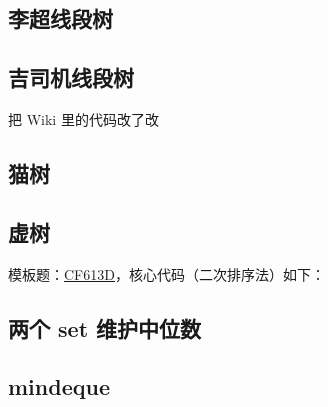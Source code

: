 \documentclass[12pt]{article}
\theoremstyle{definition}
\theoremstyle{remark}
\begin{document}


\newpage

\subsection{李超线段树}



\newpage

\subsection{吉司机线段树}

把 Wiki 里的代码改了改



\newpage

\subsection{猫树}



\newpage

\subsection{虚树}

模板题：\href{https://codeforces.com/problemset/problem/613/D}{CF613D}，核心代码（二次排序法）如下：



\newpage

\subsection{两个 set 维护中位数}



\newpage

\subsection{mindeque}


\end{document}
